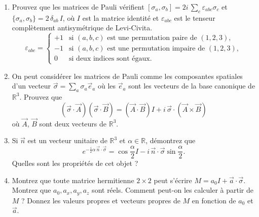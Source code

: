 \begin{enumerate}
\item Prouvez que les matrices de Pauli vérifient $[\sigma_a, \sigma_b] = 2i \, \sum_c \varepsilon_{abc} \sigma_c$ et $\lbrace\sigma_a,\sigma_b\rbrace = 2 \, \delta_{ab} \, I$, où $I$ est la matrice identité et $\varepsilon_{abc}$ est le tenseur complètement antisymétrique de Levi-Civita.
\begin{equation}
\varepsilon_{abc} = \left\lbrace
\begin{array}{cl}
+1 & \text{si } (a,b,c) \text{ est une permutation paire de }(1,2,3), \\ 
-1 & \text{si } (a,b,c) \text{ est une permutation impaire de }(1,2,3), \\  
0 & \text{si deux indices sont égaux}.
\end{array} 
\right.
\end{equation}
\item On peut considérer les matrices de Pauli comme les composantes spatiales d'un vecteur $\vec{\sigma} = \sum_a \sigma_a \vec{e}_a$ où les $\vec e_a$ sont les vecteurs de la base canonique de $\mathbb{R}^3$. Prouvez que
\begin{equation}
(\vec\sigma\cdot \vec A)(\vec\sigma \cdot \vec B) = (\vec A\cdot\vec B) I + i \, \vec\sigma \cdot (\vec A\times \vec B)
\end{equation}
où $\vec A$, $\vec B$ sont deux vecteurs de $\mathbb{R}^3$.
\item Si $\vec n$ est un vecteur unitaire de $\mathbb{R}^3$ et $\alpha\in\mathbb R$, démontrez que
\begin{equation}
e^{-\frac{i}{2} \alpha \, \vec n \cdot \vec \sigma } = \cos \frac{\alpha}{2} I - i \, \vec n \cdot \vec \sigma \sin \frac{\alpha}{2}.
\end{equation}
Quelles sont les propriétés de cet objet ?
\item Montrez que toute matrice hermitienne $2\times 2$ peut s'écrire $M = a_0 I + \vec a\cdot\vec \sigma$. Montrez que $a_0,a_x,a_y,a_z$ sont réels. Comment peut-on les calculer à partir de $M$ ? Donnez les valeurs propres et vecteurs propres de $M$ en fonction de $a_0$ et $\vec a$.
\end{enumerate}

\newpage
